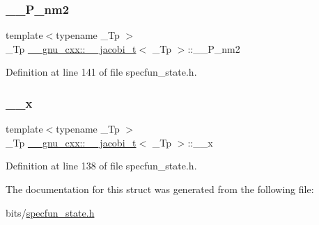 \subsubsection{\texorpdfstring{\+\_\+\+\_\+\+P\+\_\+nm2}{\_\_P\_nm2}}
{\footnotesize\ttfamily template$<$typename \+\_\+\+Tp $>$ \\
\+\_\+\+Tp \hyperlink{struct____gnu__cxx_1_1____jacobi__t}{\+\_\+\+\_\+gnu\+\_\+cxx\+::\+\_\+\+\_\+jacobi\+\_\+t}$<$ \+\_\+\+Tp $>$\+::\+\_\+\+\_\+\+P\+\_\+nm2}



Definition at line 141 of file specfun\+\_\+state.\+h.

\mbox{\label{struct____gnu__cxx_1_1____jacobi__t_aa3213c7241c094633f0be6f210b04e17}} 
\subsubsection{\texorpdfstring{\+\_\+\+\_\+x}{\_\_x}}
{\footnotesize\ttfamily template$<$typename \+\_\+\+Tp $>$ \\
\+\_\+\+Tp \hyperlink{struct____gnu__cxx_1_1____jacobi__t}{\+\_\+\+\_\+gnu\+\_\+cxx\+::\+\_\+\+\_\+jacobi\+\_\+t}$<$ \+\_\+\+Tp $>$\+::\+\_\+\+\_\+x}



Definition at line 138 of file specfun\+\_\+state.\+h.



The documentation for this struct was generated from the following file\+:\begin{DoxyCompactItemize}
\item 
bits/\hyperlink{specfun__state_8h}{specfun\+\_\+state.\+h}\end{DoxyCompactItemize}

